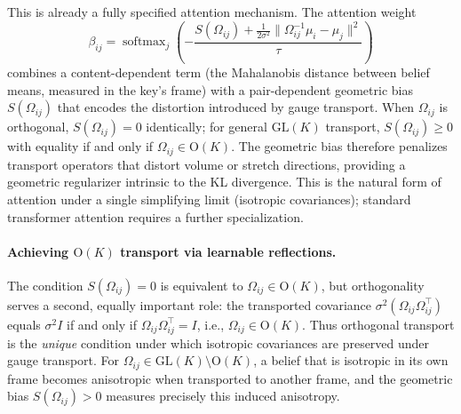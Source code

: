 \documentclass[twoside,11pt]{article}
\begin{document}
This is already a fully specified attention mechanism. The attention weight
\begin{equation}
\beta_{ij} = \operatorname{softmax}_j\!\left(-\frac{S(\Omega_{ij}) + \frac{1}{2\sigma^2}\|\Omega_{ij}^{-1}\mu_i - \mu_j\|^2}{\tau}\right)
\label{eq:general_isotropic_attention}
\end{equation}
combines a content-dependent term (the Mahalanobis distance between belief means, measured in the key's frame) with a pair-dependent geometric bias $S(\Omega_{ij})$ that encodes the distortion introduced by gauge transport. When $\Omega_{ij}$ is orthogonal, $S(\Omega_{ij}) = 0$ identically; for general $\mathrm{GL}(K)$ transport, $S(\Omega_{ij}) \geq 0$ with equality if and only if $\Omega_{ij} \in \mathrm{O}(K)$. The geometric bias therefore penalizes transport operators that distort volume or stretch directions, providing a geometric regularizer intrinsic to the KL divergence. This is the natural form of attention under a single simplifying limit (isotropic covariances); standard transformer attention requires a further specialization.

\paragraph{Achieving $\mathrm{O}(K)$ transport via learnable reflections.}
\label{par:ok_transport}

The condition $S(\Omega_{ij}) = 0$ is equivalent to $\Omega_{ij} \in \mathrm{O}(K)$, but orthogonality serves a second, equally important role: the transported covariance $\sigma^2(\Omega_{ij}\Omega_{ij}^\top)$ equals $\sigma^2 I$ if and only if $\Omega_{ij}\Omega_{ij}^\top = I$, i.e., $\Omega_{ij} \in \mathrm{O}(K)$.  Thus orthogonal transport is the \emph{unique} condition under which isotropic covariances are preserved under gauge transport.  For $\Omega_{ij} \in \mathrm{GL}(K) \setminus \mathrm{O}(K)$, a belief that is isotropic in its own frame becomes anisotropic when transported to another frame, and the geometric bias $S(\Omega_{ij}) > 0$ measures precisely this induced anisotropy.
\end{document}
